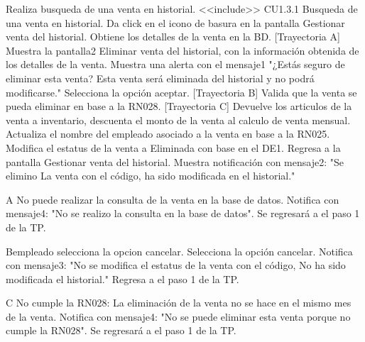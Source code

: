 
\begin{UCtrayectoria}

	\UCpaso [\UCactor]  Realiza busqueda de una venta en historial. <<include>> CU1.3.1 Busqueda de una venta en historial.
	\UCpaso [\UCactor]  Da click en el icono de basura en la pantalla Gestionar venta del historial. 
	\UCpaso [\UCsist] Obtiene los detalles de la venta en la BD. [Trayectoria A]
	\UCpaso [\UCsist] Muestra la pantalla2 Eliminar venta del historial, con la información obtenida de los detalles de la venta.
	\UCpaso [\UCsist] Muestra una alerta con el mensaje1 "¿Estás seguro de eliminar esta venta? Esta venta será eliminada del historial y no podrá modificarse."
	\UCpaso [\UCactor] Selecciona la opción aceptar. [Trayectoria B]
	\UCpaso [\UCsist] Valida que la venta se pueda eliminar en base a la RN028. [Trayectoria C]
	\UCpaso [\UCsist] Devuelve los articulos de la venta a inventario, descuenta el monto de la venta al calculo de venta mensual.
	\UCpaso [\UCsist] Actualiza el nombre del empleado asociado a la venta en base a la RN025.
	\UCpaso [\UCsist] Modifica el estatus de la venta a Eliminada con base en el DE1.
	\UCpaso [\UCsist] Regresa a la pantalla Gestionar venta del historial.
	\UCpaso [\UCsist] Muestra notificación con mensaje2: "Se elimino La venta con el código, ha sido modificada en el historial."
\end{UCtrayectoria}


\begin{UCtrayectoriaA}{A}{ No puede realizar la consulta de la venta en la base de datos.}
	\UCpaso [\UCsist] Notifica con mensaje4: "No se realizo la consulta en la base de datos".
	\UCpaso [\UCsist] Se regresará a el paso 1 de la TP.
\end{UCtrayectoriaA}


\begin{UCtrayectoriaA}{B}{empleado selecciona la opcion cancelar.}
	\UCpaso [\UCactor] Selecciona la opción cancelar.
	\UCpaso [\UCsist] Notifica con mensaje3: "No se modifica el estatus de la venta con el código, No ha sido modificada el historial."
	\UCpaso [\UCsist] Regresa a el paso 1 de la TP.
\end{UCtrayectoriaA}
\begin{UCtrayectoriaA}{C}{ No cumple la RN028: La eliminación de la venta no se hace en el mismo mes de la venta.}
	\UCpaso [\UCsist] Notifica con mensaje4: "No se puede eliminar esta venta porque no cumple la RN028".
	\UCpaso [\UCsist] Se regresará a el paso 1 de la TP.
\end{UCtrayectoriaA}
